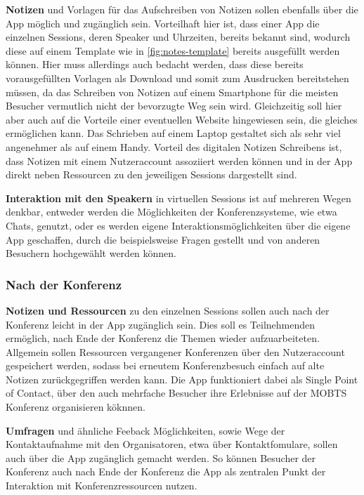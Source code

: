 \textbf{Notizen} und Vorlagen für das Aufschreiben von Notizen sollen ebenfalls über die App möglich und zugänglich sein.
Vorteilhaft hier ist, dass einer App die einzelnen Sessions, deren Speaker und Uhrzeiten, bereits bekannt sind, wodurch diese auf einem Template wie in \autoref{fig:notes-template} bereits ausgefüllt werden können.
Hier muss allerdings auch bedacht werden, dass diese bereits vorausgefüllten Vorlagen als Download und somit zum Ausdrucken bereitstehen müssen, da das Schreiben von Notizen auf einem Smartphone für die meisten Besucher vermutlich nicht der bevorzugte Weg sein wird.
Gleichzeitig soll hier aber auch auf die Vorteile einer eventuellen Website hingewiesen sein, die gleiches ermöglichen kann.
Das Schrieben auf einem Laptop gestaltet sich als sehr viel angenehmer als auf einem Handy.
Vorteil des digitalen Notizen Schreibens ist, dass Notizen mit einem Nutzeraccount assoziiert werden können und in der App direkt neben Ressourcen zu den jeweiligen Sessions dargestellt sind.

\textbf{Interaktion mit den Speakern} in virtuellen Sessions ist auf mehreren Wegen denkbar, entweder werden die Möglichkeiten der Konferenzsysteme, wie etwa Chats, genutzt, oder es werden eigene Interaktionsmöglichkeiten über die eigene App geschaffen, durch die beispielsweise Fragen gestellt und von anderen Besuchern hochgewählt werden können.

\subsubsection*{Nach der Konferenz}
\textbf{Notizen und Ressourcen} zu den einzelnen Sessions sollen auch nach der Konferenz leicht in der App zugänglich sein.
Dies soll es Teilnehmenden ermöglich, nach Ende der Konferenz die Themen wieder aufzuarbeiteten.
Allgemein sollen Ressourcen vergangener Konferenzen über den Nutzeraccount gespeichert werden, sodass bei erneutem Konferenzbesuch einfach auf alte Notizen zurückgegriffen werden kann.
Die App funktioniert dabei als Single Point of Contact, über den auch mehrfache Besucher ihre Erlebnisse auf der \ac{MOBTS} Konferenz organisieren köknnen.

\textbf{Umfragen} und ähnliche Feeback Möglichkeiten, sowie Wege der Kontaktaufnahme mit den Organisatoren, etwa über Kontaktfomulare, sollen auch über die App zugänglich gemacht werden.
So können Besucher der Konferenz auch nach Ende der Konferenz die App als zentralen Punkt der Interaktion mit Konferenzressourcen nutzen.
 
